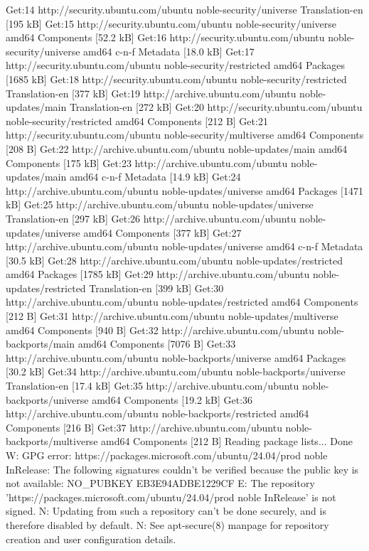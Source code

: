 Get:14 http://security.ubuntu.com/ubuntu noble-security/universe Translation-en [195 kB]
Get:15 http://security.ubuntu.com/ubuntu noble-security/universe amd64 Components [52.2 kB]
Get:16 http://security.ubuntu.com/ubuntu noble-security/universe amd64 c-n-f Metadata [18.0 kB]
Get:17 http://security.ubuntu.com/ubuntu noble-security/restricted amd64 Packages [1685 kB]
Get:18 http://security.ubuntu.com/ubuntu noble-security/restricted Translation-en [377 kB]
Get:19 http://archive.ubuntu.com/ubuntu noble-updates/main Translation-en [272 kB]
Get:20 http://security.ubuntu.com/ubuntu noble-security/restricted amd64 Components [212 B]
Get:21 http://security.ubuntu.com/ubuntu noble-security/multiverse amd64 Components [208 B]
Get:22 http://archive.ubuntu.com/ubuntu noble-updates/main amd64 Components [175 kB]
Get:23 http://archive.ubuntu.com/ubuntu noble-updates/main amd64 c-n-f Metadata [14.9 kB]
Get:24 http://archive.ubuntu.com/ubuntu noble-updates/universe amd64 Packages [1471 kB]
Get:25 http://archive.ubuntu.com/ubuntu noble-updates/universe Translation-en [297 kB]
Get:26 http://archive.ubuntu.com/ubuntu noble-updates/universe amd64 Components [377 kB]
Get:27 http://archive.ubuntu.com/ubuntu noble-updates/universe amd64 c-n-f Metadata [30.5 kB]
Get:28 http://archive.ubuntu.com/ubuntu noble-updates/restricted amd64 Packages [1785 kB]
Get:29 http://archive.ubuntu.com/ubuntu noble-updates/restricted Translation-en [399 kB]
Get:30 http://archive.ubuntu.com/ubuntu noble-updates/restricted amd64 Components [212 B]
Get:31 http://archive.ubuntu.com/ubuntu noble-updates/multiverse amd64 Components [940 B]
Get:32 http://archive.ubuntu.com/ubuntu noble-backports/main amd64 Components [7076 B]
Get:33 http://archive.ubuntu.com/ubuntu noble-backports/universe amd64 Packages [30.2 kB]
Get:34 http://archive.ubuntu.com/ubuntu noble-backports/universe Translation-en [17.4 kB]
Get:35 http://archive.ubuntu.com/ubuntu noble-backports/universe amd64 Components [19.2 kB]
Get:36 http://archive.ubuntu.com/ubuntu noble-backports/restricted amd64 Components [216 B]
Get:37 http://archive.ubuntu.com/ubuntu noble-backports/multiverse amd64 Components [212 B]
Reading package lists... Done
W: GPG error: https://packages.microsoft.com/ubuntu/24.04/prod noble InRelease: The following signatures couldn't be verified because the public key is not available: NO_PUBKEY EB3E94ADBE1229CF
E: The repository 'https://packages.microsoft.com/ubuntu/24.04/prod noble InRelease' is not signed.
N: Updating from such a repository can't be done securely, and is therefore disabled by default.
N: See apt-secure(8) manpage for repository creation and user configuration details.

